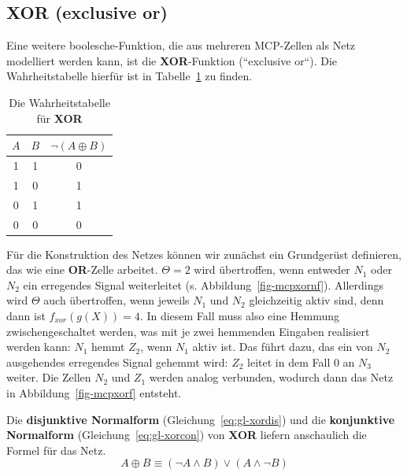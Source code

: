{\subsection*{XOR (exclusive or)}

Eine weitere boolesche-Funktion, die aus mehreren MCP-Zellen als Netz modelliert werden kann, ist die \textbf{XOR}-Funktion (``exclusive or``). Die Wahrheitstabelle hierfür ist in Tabelle~\ref{tab:xor} zu finden.

\begin{table} %
    \centering
    \begin{tabular}{c | c | c}
        $A$ & $B$ & $\neg(A \oplus B)$ \\
        \hline
        1   & 1   & 0           \\
        1   & 0   & 1           \\
        0   & 1   & 1           \\
        0   & 0   & 0           \\
    \end{tabular}
    \caption{Die Wahrheitstabelle für \textbf{XOR}}
    \label{tab:xor}
\end{table}


Für die Konstruktion des Netzes können wir zunächst ein Grundgerüst definieren, das wie eine \textbf{OR}-Zelle arbeitet. $\Theta = 2$ wird übertroffen, wenn entweder $N_1$ oder $N_2$ ein erregendes Signal weiterleitet (s. Abbildung~\ref{fig-mcpxornf}). Allerdings wird $\Theta$ auch übertroffen, wenn jeweils $N_1$ und $N_2$ gleichzeitig aktiv sind, denn dann ist $f_{xor}(g(X)) = 4$.
In diesem Fall muss also eine Hemmung zwischengeschaltet werden, was mit je zwei hemmenden Eingaben realisiert werden kann: $N_1$ hemmt $Z_2$, wenn $N_1$ aktiv ist.
Das führt dazu, das ein von $N_2$ ausgehendes erregendes Signal gehemmt wird: $Z_2$ leitet in dem Fall $0$ an $N_3$ weiter. Die Zellen $N_2$ und $Z_1$ werden analog verbunden, wodurch dann das Netz in Abbildung~\ref{fig-mcpxorf} entsteht.

Die \textbf{disjunktive Normalform} (Gleichung~\ref{eq:gl-xordis}) und die \textbf{konjunktive Normalform} (Gleichung~\ref{eq:gl-xorcon}) von \textbf{XOR} liefern anschaulich die Formel für das Netz.\\

\begin{equation}
A \oplus B \equiv (\neg A \land B) \lor (A \land \neg B)
\label{eq:gl-xordis}
\end{equation}

}
